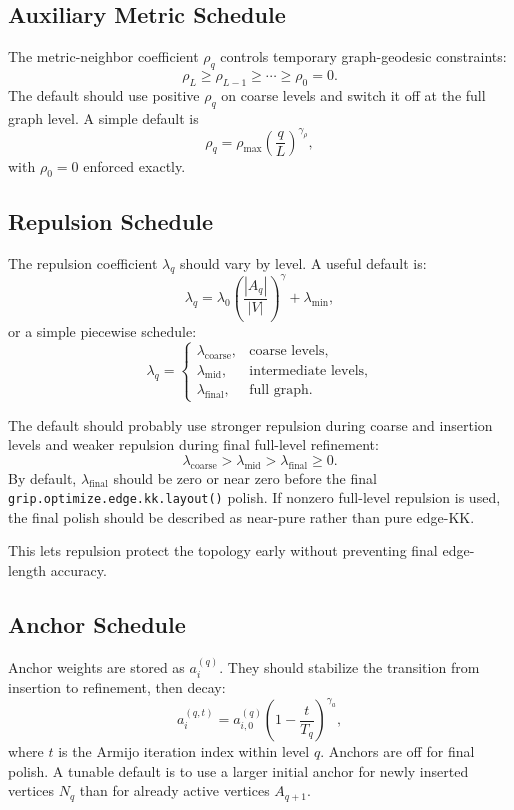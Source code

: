 \documentclass[11pt]{article}
\newcommand{\Rfunc}[1]{\texttt{#1}}
\begin{document}
\subsection{Auxiliary Metric Schedule}

The metric-neighbor coefficient \(\rho_q\) controls temporary graph-geodesic
constraints:
\[
  \rho_L \ge \rho_{L-1} \ge \cdots \ge \rho_0 = 0.
\]
The default should use positive \(\rho_q\) on coarse levels and switch it off
at the full graph level. A simple default is
\[
  \rho_q = \rho_{\max}
  \left(
    \frac{q}{L}
  \right)^{\gamma_\rho},
\]
with \(\rho_0=0\) enforced exactly.

\subsection{Repulsion Schedule}

The repulsion coefficient \(\lambda_q\) should vary by level. A useful default
is:
\[
  \lambda_q
  =
  \lambda_0
  \left(
    \frac{|A_q|}{|V|}
  \right)^\gamma
  +
  \lambda_{\min},
\]
or a simple piecewise schedule:
\[
  \lambda_q =
  \begin{cases}
    \lambda_{\mathrm{coarse}}, & \text{coarse levels},\\
    \lambda_{\mathrm{mid}},    & \text{intermediate levels},\\
    \lambda_{\mathrm{final}},  & \text{full graph}.
  \end{cases}
\]

The default should probably use stronger repulsion during coarse and insertion
levels and weaker repulsion during final full-level refinement:
\[
  \lambda_{\mathrm{coarse}}
  >
  \lambda_{\mathrm{mid}}
  >
  \lambda_{\mathrm{final}}
  \ge 0.
\]
By default, \(\lambda_{\mathrm{final}}\) should be zero or near zero before the
final \Rfunc{grip.optimize.edge.kk.layout()} polish. If nonzero full-level
repulsion is used, the final polish should be described as near-pure rather
than pure edge-KK.

This lets repulsion protect the topology early without preventing final
edge-length accuracy.

\subsection{Anchor Schedule}

Anchor weights are stored as \(a_i^{(q)}\). They should stabilize the transition
from insertion to refinement, then decay:
\[
  a_i^{(q,t)}
  =
  a_{i,0}^{(q)}
  \left(1-\frac{t}{T_q}\right)^{\gamma_a},
\]
where \(t\) is the Armijo iteration index within level \(q\). Anchors are off
for final polish. A tunable default is to use a larger initial anchor for newly
inserted vertices \(N_q\) than for already active vertices \(A_{q+1}\).
\end{document}
